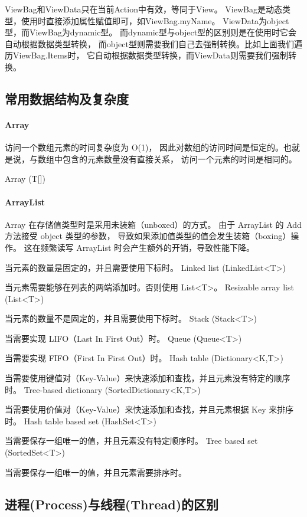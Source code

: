 \documentclass{book}
\begin{document}
ViewBag和ViewData只在当前Action中有效，等同于View。
ViewBag是动态类型，使用时直接添加属性赋值即可，如ViewBag.myName。
ViewData为object型，而ViewBag为dynamic型。
而dynamic型与object型的区别则是在使用时它会自动根据数据类型转换，
而object型则需要我们自己去强制转换。比如上面我们遍历ViewBag.Items时，
它自动根据数据类型转换，而ViewData则需要我们强制转换。

\subsection{常用数据结构及复杂度}

\paragraph{Array}访问一个数组元素的时间复杂度为 O(1)，
因此对数组的访问时间是恒定的。也就是说，与数组中包含的元素数量没有直接关系，
访问一个元素的时间是相同的。

Array (T[])

\paragraph{ArrayList}Array 在存储值类型时是采用未装箱（unboxed）的方式。
由于 ArrayList 的 Add 方法接受 object 类型的参数，
导致如果添加值类型的值会发生装箱（boxing）操作。
这在频繁读写 ArrayList 时会产生额外的开销，导致性能下降。

当元素的数量是固定的，并且需要使用下标时。
Linked list (LinkedList<T>)

当元素需要能够在列表的两端添加时。否则使用 List<T>。
Resizable array list (List<T>)

当元素的数量不是固定的，并且需要使用下标时。
Stack (Stack<T>)

当需要实现 LIFO（Last In First Out）时。
Queue (Queue<T>)

当需要实现 FIFO（First In First Out）时。
Hash table (Dictionary<K,T>)

当需要使用键值对（Key-Value）来快速添加和查找，并且元素没有特定的顺序时。
Tree-based dictionary (SortedDictionary<K,T>)

当需要使用价值对（Key-Value）来快速添加和查找，并且元素根据 Key 来排序时。
Hash table based set (HashSet<T>)

当需要保存一组唯一的值，并且元素没有特定顺序时。
Tree based set (SortedSet<T>)

当需要保存一组唯一的值，并且元素需要排序时。

\subsection{进程(Process)与线程(Thread)的区别}
\end{document}
